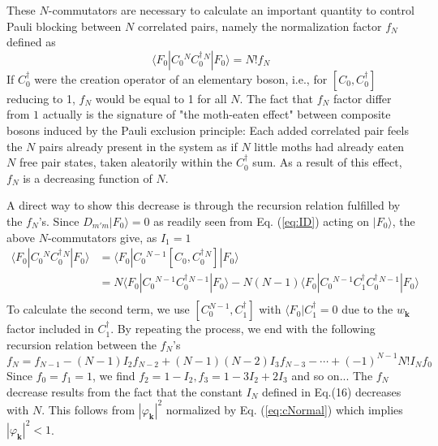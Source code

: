 \documentclass[aps,prb,preprint,groupedaddress,amsmath]{revtex4-1}
\newcommand{\vk}{\ensuremath{\mathbf{k}}}
\newcommand{\dg}{\ensuremath{\dagger}}
\begin{document}
These $N$-commutators are necessary to calculate an important quantity to control Pauli blocking between $N$ correlated pairs, namely the normalization factor $f_N$ defined as
\begin{equation}\label{eq:cn}
\langle{}F_0|{C_0^{ }}{}^N{C_0^\dg}{}^N|F_0{\rangle}=N!f_N
\end{equation}
If $C^\dg_0$ were the creation operator of an elementary boson, i.e., for $[C_0,C^\dg_0]$ reducing to 1,  $f_N$ would be equal to 1 for all $N$.  The fact that $f_N$ factor differ from $1$ actually is the signature of "the moth-eaten effect" between composite bosons induced by the Pauli exclusion principle: Each added correlated pair feels the $N$ pairs already present in the system as if $N$ little moths had already eaten $N$ free pair states, taken aleatorily within the $C^\dg_{0}$ sum.  As a result of this effect, $f_N$ is a decreasing function of $N$. 

A direct way to show this decrease is through  the recursion relation fulfilled by the $f_N$'s.  Since $D_{m'm}|F_0\rangle=0 $  as readily seen from Eq. (\ref{eq:ID}) acting on $|F_0\rangle$, the above $N$-commutators give,  as $I_1=1$ 
\begin{equation}
\begin{split} 
\langle{}F_0|{C_0^{ }}{}^N{C_0^\dg}{}^N|F_0{\rangle}&
	=\langle{}F_0|{C_0^{ }}{}^{N-1}[C_0,{C_0^\dg}{}^N]|F_0{\rangle}\\
	&=N\langle{}F_0|{C_0^{ }}{}^{N-1}{C_0^\dg}{}^{N-1}|F_0{\rangle}
	-N(N-1)\langle{}F_0|{C_0^{ }}{}^{N-1}C_1^\dg{C_0^\dg}{}^{N-1}|F_0{\rangle}\\
\end{split}
\end{equation}
To calculate the second term, we  use $[C_0^{N-1},C_1^\dg]$ with $\langle{}F_0|C^\dg_1=0$ due to the $w_\vk$ factor included in $C^\dg_1$. By repeating the process, we end with the following recursion relation between the $f_N$'s 
\begin{equation}\label{eq:fn}
f_N=f_{N-1}-(N-1)I_2f_{N-2}+(N-1)(N-2)I_3f_{N-3}-\cdots+(-1)^{N-1}N!I_Nf_0
\end{equation}
Since $f_0=f_1=1$, we find $f_2=1-I_2,f_3=1-3I_2+2I_3$ and so on... The $f_N$ decrease results from the fact that  the constant $I_N$ defined in Eq.(16) decreases with $N$. This follows from  $|\varphi_\vk|^2$ normalized by  Eq. (\ref{eq:cNormal}) which implies $|\varphi_\vk|^2<1$.
\end{document}
